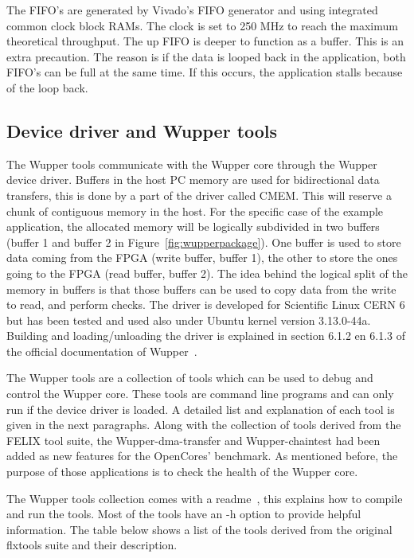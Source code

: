 The FIFO's are generated by Vivado's FIFO generator and using integrated common clock block RAMs. The clock is set to 250 MHz to reach the maximum theoretical throughput. The up FIFO is deeper to function as a buffer. This is an extra precaution. The reason is if the data is looped back in the application, both FIFO's can be full at the same time. If this occurs, the application stalls because of the loop back.

\newpage


\subsection{Device driver and Wupper tools}


The Wupper tools communicate with the Wupper core through the Wupper device driver. Buffers in the host PC memory are used for bidirectional data transfers, this is done by a part of the driver called CMEM. This will reserve a chunk of contiguous memory in the host. For the specific case of the example application, the allocated memory will be logically subdivided in two buffers (buffer 1 and buffer 2 in Figure~\ref{fig:wupperpackage}). One buffer is used to store data coming from the FPGA (write buffer, buffer 1), the other to store the ones going to the FPGA (read buffer, buffer 2). The idea behind the logical split of the memory in buffers is that those buffers can be used to copy data from the write to read, and perform checks. The driver is developed for Scientific Linux CERN 6 but has been tested and used also under Ubuntu kernel version 3.13.0-44a. Building and loading/unloading the driver is explained in section 6.1.2 en 6.1.3 of the official documentation of Wupper~\cite{operatingpcieengine}.

The Wupper tools are a collection of tools which can be used to debug and control the Wupper core. These tools are command line programs and can only run if the device driver is loaded. A detailed list and explanation of each tool is given in the next paragraphs. Along with the collection of tools derived from the FELIX tool suite, the Wupper-dma-transfer and Wupper-chaintest had been added as new features for the OpenCores' benchmark. As mentioned before, the purpose of those applications is to check the health of the Wupper core. 

The Wupper tools collection comes with a readme~\cite{wupperreadme}, this explains how to compile and run the tools. Most of the tools have an -h option to provide helpful information. The table below shows a list of the tools derived from the original flxtools suite and their description.

